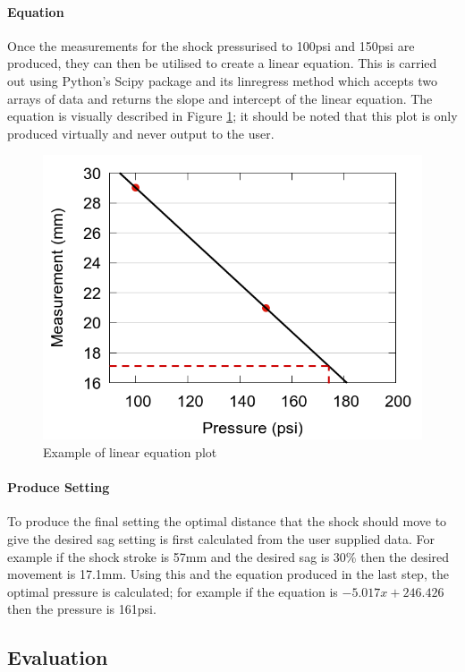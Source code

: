 		\paragraph{Equation}
			Once the measurements for the shock pressurised to 100psi and 150psi are produced, they can then be utilised to create a linear equation. This is carried out using Python's Scipy package and its linregress method which accepts two arrays of data and returns the slope and intercept of the linear equation. The equation is visually described in Figure \ref{fig:equation_plot}; it should be noted that this plot is only produced virtually and never output to the user.
			\begin{figure}[h!]
				\centering
				\includegraphics[scale=0.4]{../images/results/scatter_dotted.png}
				\caption{Example of linear equation plot}
				\label{fig:equation_plot}
			\end{figure}
		\paragraph{Produce Setting}
			To produce the final setting the optimal distance that the shock should move to give the desired sag setting is first calculated from the user supplied data. For example if the shock stroke is 57mm and the desired sag is 30\% then the desired movement is 17.1mm. Using this and the equation produced in the last step, the optimal pressure is calculated; for example if the equation is $-5.017x + 246.426$ then the pressure is 161psi.
\clearpage
\subsection{Evaluation}
